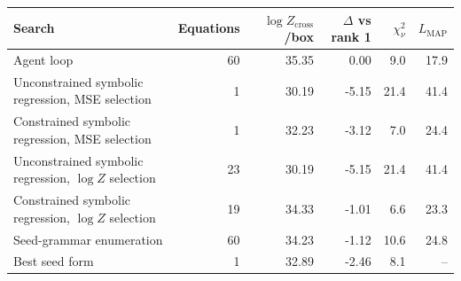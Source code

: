 \setlength{\tabcolsep}{4pt}
\begin{tabular}{lrrrrr}
\toprule
Search & Equations & $\log Z_\mathrm{cross}$/box & $\Delta$ vs rank 1 & $\chi^2_\nu$ & $L_\mathrm{MAP}$ \\
\midrule
Agent loop & 60 & 35.35 & 0.00 & 9.0 & 17.9 \\
Unconstrained symbolic regression, MSE selection & 1 & 30.19 & -5.15 & 21.4 & 41.4 \\
Constrained symbolic regression, MSE selection & 1 & 32.23 & -3.12 & 7.0 & 24.4 \\
Unconstrained symbolic regression, $\log Z$ selection & 23 & 30.19 & -5.15 & 21.4 & 41.4 \\
Constrained symbolic regression, $\log Z$ selection & 19 & 34.33 & -1.01 & 6.6 & 23.3 \\
Seed-grammar enumeration & 60 & 34.23 & -1.12 & 10.6 & 24.8 \\
Best seed form & 1 & 32.89 & -2.46 & 8.1 & -- \\
\bottomrule
\end{tabular}
